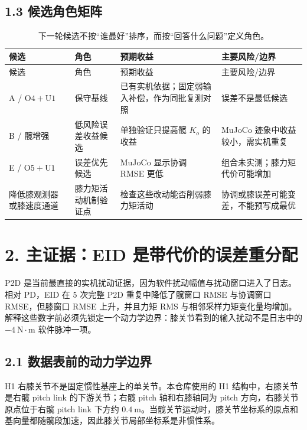 \subsection{1.3 候选角色矩阵}

\begin{longtable}[]{@{}
  >{\raggedright\arraybackslash}p{}
  >{\raggedright\arraybackslash}p{}
  >{\raggedright\arraybackslash}p{}
  >{\raggedright\arraybackslash}p{}@{}}
\caption{下一轮候选不按``谁最好''排序，而按``回答什么问题''定义角色。}\\
\toprule
候选 & 角色 & 预期收益 & 主要风险/边界 \\
\midrule
\endfirsthead
\toprule
候选 & 角色 & 预期收益 & 主要风险/边界 \\
\midrule
\endhead
\bottomrule
\endlastfoot
A / \(\mathrm{O4+U1}\) & 保守基线 & 已有实机依据；固定弱输入补偿，作为同批复测对照 & 误差不是最低候选 \\
B / 髋增强 & 低风险误差收益候选 & 单独验证只提高髋 \(K_o\) 的收益 & MuJoCo 迹象中收益较小，需实机重复 \\
E / \(\mathrm{O5+U1}\) & 误差优先候选 & MuJoCo 显示协调 RMSE 更低 & 组合未实测；膝力矩代价可能增加 \\
降低膝观测器或膝速度通道 & 膝力矩活动机制验证点 & 检查这些改动能否削弱膝力矩活动 & 协调或膝误差可能变差，不能预写成最优 \\
\end{longtable}

\section{2. 主证据：EID 是带代价的误差重分配}
\label{sec:p2d}

P2D 是当前最直接的实机扰动证据，因为软件扰动幅值与扰动窗口进入了日志。相对 PD，EID 在 5 次完整 P2D 重复中降低了髋窗口 RMSE 与协调窗口 RMSE，但膝窗口 RMSE 上升，并且力矩 RMS 与相邻采样力矩变化量均增加。解释这些数字前必须先锁定一个动力学边界：膝关节看到的输入扰动不是日志中的 \(-4\ \mathrm{N\cdot m}\) 软件脉冲一项。

\subsection{2.1 数据表前的动力学边界}

H1 右膝关节不是固定惯性基座上的单关节。本仓库使用的 H1 结构中，右膝关节是右髋 pitch link 的下游关节；右髋 pitch 轴和右膝轴同为 pitch 方向，右膝关节原点位于右髋 pitch link 下方约 \(0.4\ \mathrm{m}\)。当髋关节运动时，膝关节坐标系的原点和基向量都随髋段加速，因此膝关节局部坐标系是非惯性系。

